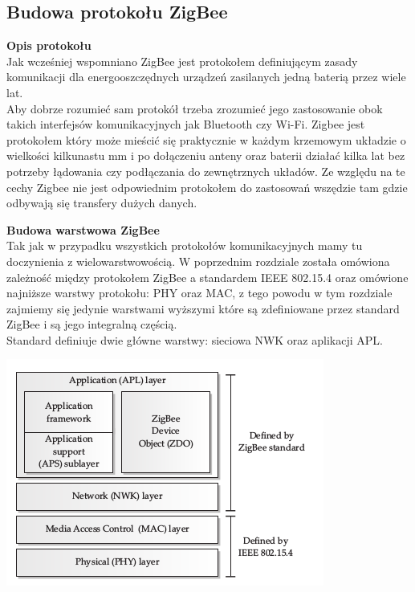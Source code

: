 \subsection{Budowa protokołu ZigBee}

\par
\tab \textbf{Opis protokołu} \\
 Jak wcześniej wspomniano ZigBee jest protokołem definiującym zasady komunikacji dla energooszczędnych urządzeń zasilanych jedną baterią przez wiele lat. \\
\tab Aby dobrze rozumieć sam protokół trzeba zrozumieć jego zastosowanie obok takich interfejsów komunikacyjnych jak Bluetooth czy Wi-Fi. Zigbee jest protokołem który może mieścić się praktycznie w każdym krzemowym układzie o wielkości kilkunastu mm i po dołączeniu anteny oraz baterii działać kilka lat bez potrzeby łądowania czy podłączania do zewnętrznych układów. Ze względu na te cechy Zigbee nie jest odpowiednim protokołem do zastosowań wszędzie tam gdzie odbywają się transfery dużych danych. \\

\par
\tab \textbf{Budowa warstwowa ZigBee} \\ 
Tak jak w przypadku wszystkich protokołów komunikacyjnych mamy tu doczynienia z wielowarstwowością. W poprzednim rozdziale została omówiona zależność między protokołem ZigBee a standardem IEEE 802.15.4 oraz omówione najniższe warstwy  protokołu: PHY oraz MAC, z tego powodu w tym rozdziale zajmiemy się jedynie warstwami wyższymi które są zdefiniowane przez standard ZigBee i są jego integralną częścią. \\
Standard definiuje dwie główne warstwy: sieciowa NWK oraz aplikacji APL.  \\

\centerline{ \includegraphics[scale=0.60]{./img/zigbee_layers.png} }

